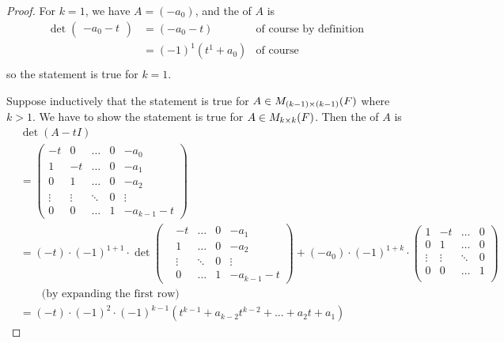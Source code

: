 \begin{proof}
For \(k = 1\), we have \(A = (-a_0)\), and the \CPOLY{} of \(A\) is
\begin{align*}
    \det \begin{pmatrix} -a_0 - t \end{pmatrix}
    & = (-a_0 - t) & \text{of course by definition} \\
    & = (-1)^1 (t^1 + a_0) & \text{of course} \\
\end{align*}
so the statement is true for \(k = 1\).

Suppose inductively that the statement is true for \(A \in M_{(k - 1) \times (k - 1)}(F)\) where \(k > 1\).
We have to show the statement is true for \(A \in M_{k \times k}(F)\).
Then the \CPOLY{} of \(A\) is
\begin{align*}
    & \det(A - tI) \\
    & = \begin{pmatrix}
        -t     & 0      & \dots  & 0 & -a_0 \\
        1      & -t     & \dots  & 0 & -a_1 \\
        0      & 1      & \dots  & 0 & -a_2 \\
        \vdots & \vdots & \ddots & 0 & \vdots \\
        0      & 0      & \dots  & 1 & -a_{k - 1} - t
    \end{pmatrix} \\
    & = (-t) \cdot (-1)^{1 + 1} \cdot \det \begin{pmatrix}
        & -t     & \dots  & 0 & -a_1 \\
        & 1      & \dots  & 0 & -a_2 \\
        & \vdots & \ddots & 0 & \vdots \\
        & 0      & \dots & 1 & -a_{k - 1}-t
    \end{pmatrix}
      + (-a_0) \cdot (-1)^{1 + k} \cdot \begin{pmatrix}
            1      & -t     & \dots  & 0 \\
            0      & 1      & \dots  & 0 \\
            \vdots & \vdots & \ddots & 0 \\
            0      & 0      & \dots  & 1 \\
        \end{pmatrix} \\
    & \quad \quad \text{(by expanding the first row)} \\
    & = (-t) \cdot (-1)^{2} \cdot (-1)^{k - 1} (t^{k - 1} + a_{k - 2} t^{k-2} + ... + a_2 t + a_1)

\end{align*}
\end{proof}

